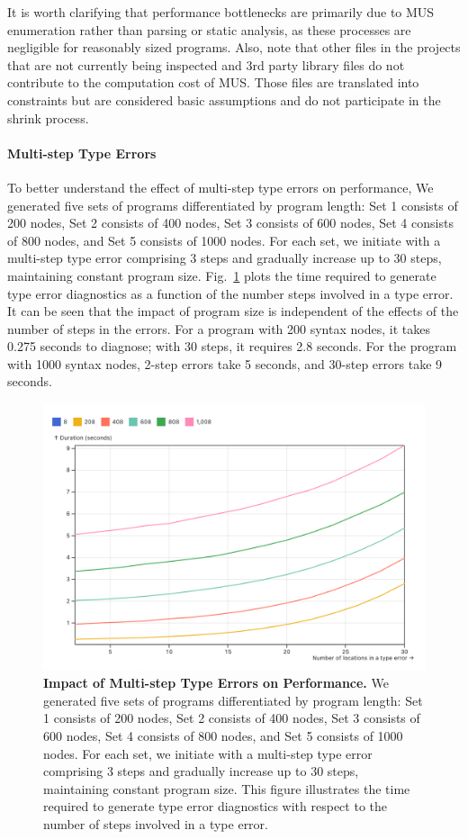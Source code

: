 \documentclass[pdflatex,lineno,sn-nature,Numbered]{sn-jnl}%
\begin{document}
It is worth clarifying that performance bottlenecks are primarily due to MUS enumeration rather than parsing or static analysis, as these processes are negligible for reasonably sized programs. Also, note that other files in the projects that are not currently being inspected and 3rd party library files do not contribute to the computation cost of MUS. Those files are translated into constraints but are considered basic assumptions and do not participate in the shrink process.

\paragraph{Multi-step Type Errors}

To better understand the effect of multi-step type errors on performance,
We generated five sets of programs differentiated by program length: Set 1 consists of 200 nodes, Set 2 consists of 400 nodes, Set 3 consists of 600 nodes, Set 4 consists of 800 nodes, and Set 5 consists of 1000 nodes. For each set, we initiate with a multi-step type error comprising 3 steps and gradually increase up to 30 steps, maintaining constant program size. Fig.~\ref{fig:multi-step-time} plots the time required to generate type error diagnostics as a function of the number steps involved in a type error.  It can be seen that the impact of program size is independent of the effects of the number of steps in the errors. For a program with 200 syntax nodes, it takes 0.275 seconds to diagnose; with 30 steps, it requires 2.8 seconds. For the program with 1000 syntax nodes, 2-step errors take 5 seconds, and 30-step errors take 9 seconds.

\begin{figure}[ht]
    \centering
    \includegraphics[width=0.8\linewidth]{images/multi-step.png}
    \caption{{\bf Impact of Multi-step Type Errors on Performance.} We generated five sets of programs differentiated by program length: Set 1 consists of 200 nodes, Set 2 consists of 400 nodes, Set 3 consists of 600 nodes, Set 4 consists of 800 nodes, and Set 5 consists of 1000 nodes. For each set, we initiate with a multi-step type error comprising 3 steps and gradually increase up to 30 steps, maintaining constant program size. This figure illustrates the time required to generate type error diagnostics with respect to the number of steps involved in a type error. }
    \label{fig:multi-step-time}
\end{figure}
\end{document}
